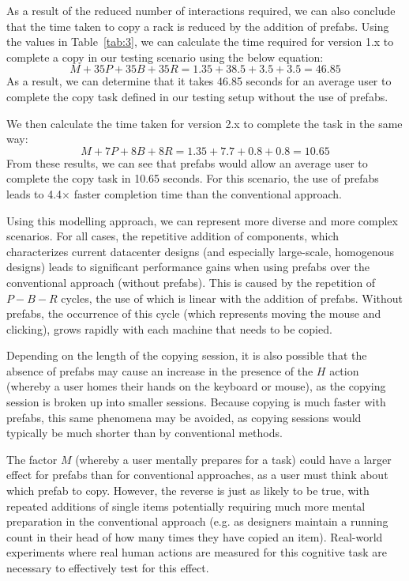 \documentclass[11pt]{article}
\begin{document}
			As a result of the reduced number of interactions required, we can also conclude that the time taken to copy a rack is reduced by the addition of prefabs.
			Using the values in Table~\ref{tab:3}, we can calculate the time required for version 1.x to complete a copy in our testing scenario using the below equation:
			$$M + 35P + 35B + 35R= 1.35 + 38.5 + 3.5 + 3.5= 46.85$$
			As a result, we can determine that it takes 46.85 seconds for an average user to complete the copy task defined in our testing setup without the use of prefabs.

			We then calculate the time taken for version 2.x to complete the task in the same way:
			$$M + 7P + 8B + 8R= 1.35 + 7.7 + 0.8 + 0.8= 10.65$$
			From these results, we can see that prefabs would allow an average user to complete the copy task in 10.65 seconds.
			For this scenario, the use of prefabs leads to 4.4$\times$ faster completion time than the conventional approach.

			Using this modelling approach, we can represent more diverse and more complex scenarios. 
			For all cases, the repetitive addition of components, which characterizes current datacenter designs (and especially large-scale, homogenous designs) leads to significant performance gains when using prefabs over the conventional approach (without prefabs).
			This is caused by the repetition of $P-B-R$ cycles, the use of which is linear with the addition of prefabs.
			Without prefabs, the occurrence of this cycle (which represents moving the mouse and clicking), grows rapidly with each machine that needs to be copied.
			
			Depending on the length of the copying session, it is also possible that the absence of prefabs may cause an increase in the presence of the $H$ action (whereby a user homes their hands on the keyboard or mouse), as the copying session is broken up into smaller sessions.
			Because copying is much faster with prefabs, this same phenomena may be avoided, as copying sessions would typically be much shorter than by conventional methods.

			The factor $M$ (whereby a user mentally prepares for a task) could have a larger effect for prefabs than for conventional approaches, as a user must think about which prefab to copy.
			However, the reverse is just as likely to be true, with repeated additions of single items potentially requiring much more mental preparation in the conventional approach (e.g. as designers maintain a running count in their head of how many times they have copied an item).
			Real-world experiments where real human actions are measured for this cognitive task are necessary to effectively test for this effect.
\end{document}
